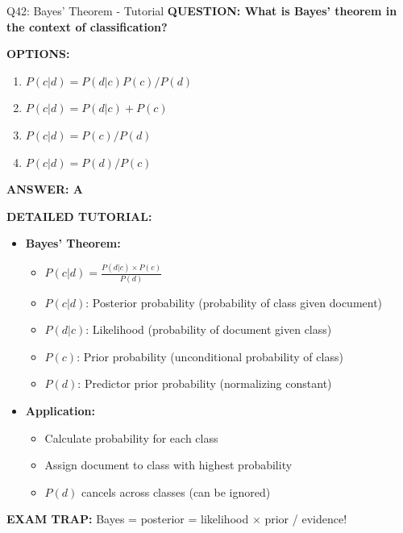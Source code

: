 \documentclass[8pt]{beamer}
\begin{document}
	\begin{frame}{Q42: Bayes' Theorem - Tutorial}
		\fontsize{6.5}{7.5}\selectfont
		\textbf{QUESTION: What is Bayes' theorem in the context of classification?}
		
		\vspace{0.1cm}
		\textbf{OPTIONS:}
		\begin{enumerate}
			\item $P(c|d) = P(d|c)P(c) / P(d)$
			\item $P(c|d) = P(d|c) + P(c)$
			\item $P(c|d) = P(c) / P(d)$
			\item $P(c|d) = P(d) / P(c)$
		\end{enumerate}
		
		\vspace{0.1cm}
		\textcolor{myblue}{\textbf{ANSWER: A}}
		
		\vspace{0.1cm}
		\textbf{DETAILED TUTORIAL:}
		\begin{itemize}
			\item \textbf{Bayes' Theorem:}
			\begin{itemize}
				\item $P(c|d) = \frac{P(d|c) \times P(c)}{P(d)}$
				\item $P(c|d)$: Posterior probability (probability of class given document)
				\item $P(d|c)$: Likelihood (probability of document given class)
				\item $P(c)$: Prior probability (unconditional probability of class)
				\item $P(d)$: Predictor prior probability (normalizing constant)
			\end{itemize}
			\item \textbf{Application:}
			\begin{itemize}
				\item Calculate probability for each class
				\item Assign document to class with highest probability
				\item $P(d)$ cancels across classes (can be ignored)
			\end{itemize}
		\end{itemize}
		
		\textcolor{myred}{\textbf{EXAM TRAP:}} Bayes = \textcolor{myblue}{posterior = likelihood $\times$ prior / evidence}!
	\end{frame}
	
\end{document}
